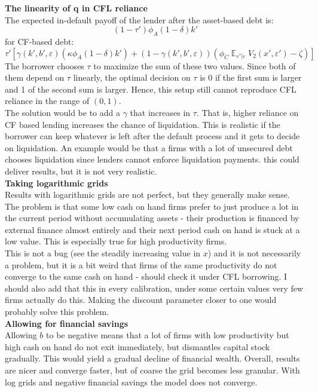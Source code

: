 \documentclass[12pt]{article}
\DeclareMathOperator{\E}{\mathbb{E}}
\begin{document}
\textbf{The linearity of q in CFL reliance} \\
The expected in-default payoff of the lender after the asset-based debt is: 
$$  (1-\tau') \phi_A (1-\delta) k'  $$
for CF-based debt: 
$$    \tau'\left[\gamma(k',b',\varepsilon)(\kappa \phi_A  (1-\delta) k') +  (1-\gamma(k',b',\varepsilon))\left( \phi_C \E_{\varepsilon'|\varepsilon}V_2 (x', \varepsilon') - \zeta \right) \right] $$
The borrower chooses $\tau$ to maximize the sum of these two values. Since both of them depend on $\tau$ linearly, the optimal decision on $\tau$ is 0 if the first sum is larger and 1 of the second sum is larger. Hence, this setup still cannot reproduce CFL reliance in the range of $(0,1)$. \vspace{3mm} \\
The solution would be to add a $\gamma$ that increases in $\tau$. That is, higher reliance on CF based lending increases the chance of liquidation. This is realistic if the borrower can keep whatever is left after the default process and it gets to decide on liquidation. An example would be that a firms with a lot of unsecured debt chooses liquidation since lenders cannot enforce liquidation payments. this could deliver results, but it is not very realistic. \vspace{3mm} \\
\textbf{Taking logarithmic grids} \\
Results with logarithmic grids are not perfect, but they generally make sense. The problem is that some low cash on hand firms prefer to just produce a lot in the current period without accumulating assets - their production is financed by external finance almost entirely and their next period cash on hand is stuck at a low value.  This is especially true for high productivity firms. \vspace{3mm} \\
This is not a bug (see the steadily increasing value in $x$) and it is not necessarily a problem, but it is a bit weird that firms of the same productivity do not converge to the same cash on hand - should check it under CFL borrowing. I should also add that this in every calibration, under some certain values very few firms actually do this. Making the discount parameter closer to one would probably solve this problem.   \vspace{3mm} \\
\textbf{Allowing for financial savings} \\
Allowing $b$ to be negative means that a lot of firms with low productivity but high cash on hand do not exit immediately, but dismantles capital stock gradually. This would yield a gradual decline of financial wealth. Overall, results are nicer and converge faster, but of coarse the grid becomes less granular. With log grids and negative financial savings the model does not converge.  \vspace{3mm} \\
\end{document}
